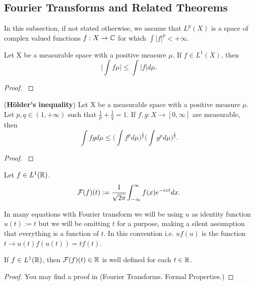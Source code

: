 \documentclass[main.tex]{subfiles}
\begin{document}
\subsection{Fourier Transforms and Related Theorems}
In this subsection, if not stated otherwise, we assume that $L^p(X)$ is a space of complex valued functions $f:X\to \mathbb{C}$ for which $\int|f|^p < +\infty$.
\begin{theorem}
\label{basic-integral-inequality}
Let X be a measurable space with a positive measure $\mu$.
If $f\in L^1(X)$, then
\begin{equation}
    \bigg\vert\int f\mu\bigg\vert \leq \int|f|d\mu. 
\end{equation}
\end{theorem}
\begin{proof}
\cite[see][Abstract Integration]{rudin1987}
\end{proof}
\begin{theorem}(\textbf{Hölder's inequality})
\label{holder-inequality}
Let X be a measurable space with a positive measure $\mu$.
Let $p,q\in(1, +\infty)$ such that $\frac{1}{p} + \frac{1}{q} = 1$. If $f,g:X\to[0,\infty]$ are measurable, then
\begin{equation}
    \int fg d\mu \leq \bigg(\int f^p d\mu\bigg)^{\frac{1}{p}} \bigg(\int g^p d\mu\bigg)^{\frac{1}{p}}.
\end{equation}
\end{theorem}
\begin{proof}
\cite[see][$L^p$-Spaces]{rudin1987}
\end{proof}
\begin{definition}
\label{fourier}
Let $f\in L^1(\mathbb{R})$.
\begin{equation}
    \mathcal{F}(f)(t) := \cfrac{1}{\sqrt{2\pi}}\int_{-\infty}^{\infty} f(x)e^{-ixt}dx.
\end{equation}
\end{definition}

In many equations with Fourier transform we will be using $u$ as identity function $u(t) := t$ but we will be omitting $t$ for a purpose, making a silent assumption that everything is a function of $t$. In this convention i.e. $uf(u)$ is the function $t\to u(t)f(u(t)) = tf(t)$.

\begin{theorem}
If $f\in L^1(\mathbb{R})$, then $\mathcal{F}(f)(t)\in\mathbb{R}$ is well defined for each $t\in\mathbb{R}$.
\end{theorem}
\begin{proof}
You may find a proof in \cite{rudin1987} (Fourier Transforms. Formal Properties.)
\end{proof}
\end{document}
